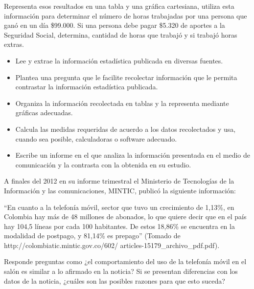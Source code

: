 Representa esos resultados en una tabla y una gráfica cartesiana, utiliza esta información para determinar el número de horas trabajadas por una persona que ganó en un día \$99.000. Si una persona debe pagar \$5.320 de aportes a la Seguridad Social, determina, cantidad de horas que trabajó y si trabajó horas extras.


\evidencias

\begin{itemize}
  \item Lee y extrae la información estadística publicada en diversas fuentes.
  \item Plantea una pregunta que le facilite recolectar información que le permita contrastar la información estadística publicada.
  \item Organiza la información recolectada en tablas y la representa mediante gráficas adecuadas.
  \item Calcula las medidas requeridas de acuerdo a los datos recolectados y usa, cuando sea posible, calculadoras o software adecuado.
  \item Escribe un informe en el que analiza la información presentada en el medio de comunicación y la contrasta con la obtenida en su estudio.
\end{itemize}

\ejemplo

A finales del 2012 en su informe trimestral el Ministerio de Tecnologías de la Información y las comunicaciones, MINTIC, publicó la siguiente información:

“En cuanto a la telefonía móvil, sector que tuvo un crecimiento de 1,13\%, en Colombia hay más de 48 millones de abonados, lo que quiere decir que en el país hay 104,5 líneas por cada 100 habitantes. De estos 18,86\% se encuentra en la modalidad de postpago, y 81,14\% es prepago” (Tomado de http://colombiatic.mintic.gov.co/602/ articles-15179\_archivo\_pdf.pdf).

Responde preguntas como ¿el comportamiento del uso de la telefonía móvil en el salón es similar a lo afirmado en la noticia? Si se presentan diferencias con los datos de la noticia, ¿cuáles son las posibles razones para que esto suceda?


